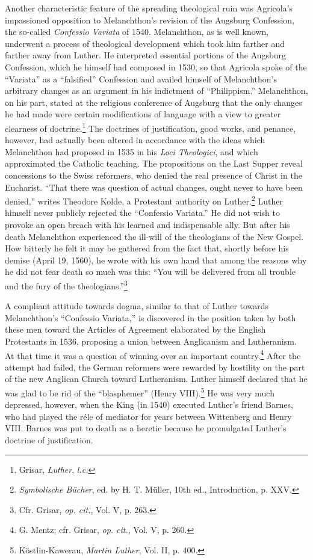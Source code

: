 Another characteristic feature of the spreading theological ruin
was Agricola’s impassioned opposition to Melanchthon’s revision of
the Augsburg Confession, the so-called \textit{Confessio Variata} of 1540.
Melanchthon, as is well known, underwent a process of theological
development which took him farther and farther away from Luther.
He interpreted essential portions of the Augsburg Confession, which
he himself had composed in 1530, so that Agricola spoke of the “Variata”
as a “falsified” Confession and availed himself of Melanchthon’s
arbitrary changes as an argument in his indictment of “Philippism.”
Melanchthon, on his part, stated at the religious conference of Augsburg
that the only changes he had made were certain modifications
of language with a view to greater clearness of doctrine.\footnote{Grisar, \textit{Luther}, \textit{l.c.}}
 The doctrines
of justification, good works, and penance, however, had actually been
altered in accordance with the ideas which Melanchthon
had proposed in 1535 in his \textit{Loci Theologici}, and which approximated
the Catholic teaching. The propositions on the Last Supper reveal
concessions to the Swiss reformers, who denied the real presence of
Christ in the Eucharist. “That there was question of actual changes,
ought never to have been denied,” writes Theodore Kolde, a Protestant
authority on Luther.\footnote{\textit{Symbolische Bücher}, ed. by H. T. Müller, 10th ed., Introduction, p. XXV.}
Luther himself never publicly rejected
the “Confessio Variata.” He did not wish to provoke an open breach
with his learned and indispensable ally. But after his death Melanchthon
experienced the ill-will of the theologians of the New Gospel.
How bitterly he felt it may be gathered from the fact that, shortly
before his demise (April 19, 1560), he wrote with his own hand that
among the reasons why he did not fear death so much was this: “You
will be delivered from all trouble and the fury of the theologians.”\footnote{Cfr. Grisar, \textit{op. cit.}, Vol. V, p. 263.}

A compliant attitude towards dogma, similar to that of Luther
towards Melanchthon’s “Confessio Variata,” is discovered in the position
taken by both these men toward the Articles of Agreement
elaborated by the English Protestants in 1536, proposing a union between
Anglicanism and Lutheranism. At that time it was a question
of winning over an important country.\footnote{G. Mentz; cfr. Grisar, \textit{op. cit.}, Vol. V, p. 260.}
 After the attempt had
failed, the German reformers were rewarded by hostility on the part
of the new Anglican Church toward Lutheranism. Luther himself
declared that he was glad to be rid of the “blasphemer” (Henry
VIII).\footnote{Köstlin-Kawerau, \textit{Martin Luther}, Vol. II, p. 400.}
 He was very much depressed, however, when the King (in
1540) executed Luther’s friend Barnes, who had played the réle of
mediator for years between Wittenberg and Henry VIII. Barnes was
put to death as a heretic because he promulgated Luther’s doctrine
of justification.

